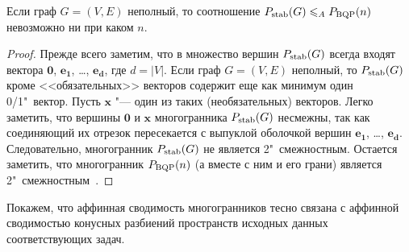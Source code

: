 \begin{prop}
	\label{prop:StableBQP}
	Если граф $G=(V,E)$ неполный, то соотношение $P_{\textup{stab}}(G) \leqslant_A P_{\textup{BQP}}(n)$ невозможно ни при каком $n$.
\end{prop}

\begin{proof}
Прежде всего заметим, что в множество вершин $P_{\textup{stab}}(G)$ всегда входят вектора $\bm{0}$, $\bm{e_1}$, \dots, $\bm{e_d}$, где $d=|V|$.
Если граф $G=(V,E)$ неполный, то $P_{\textup{stab}}(G)$ кроме <<обязательных>> векторов содержит еще как минимум один 0/1"~вектор. Пусть $\bm{x}$ "--- один из таких (необязательных) векторов. Легко заметить, что вершины $\bm{0}$ и $\bm{x}$ многогранника $P_{\textup{stab}}(G)$ несмежны, так как соединяющий их отрезок пересекается с выпуклой оболочкой вершин $\bm{e_1}$, \dots, $\bm{e_d}$.
Следовательно, многогранник $P_{\textup{stab}}(G)$ не является 2"~смежностным.
Остается заметить, что многогранник $P_{\textup{BQP}}(n)$ (а вместе с ним и его грани) является 2"~смежностным~\cite{Bondarenko:1987,Padberg:1989}.
\end{proof}


Покажем, что аффинная сводимость многогранников тесно связана с аффинной сводимостью конусных разбиений пространств исходных данных соответствующих задач. 

